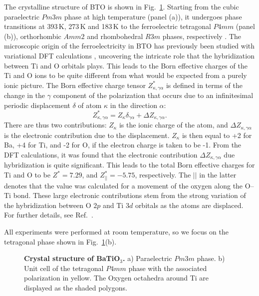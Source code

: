The crystalline structure of BTO is shown in Fig.~\ref{fig:BTO_crystal}.
Starting from the cubic paraelectric $Pm3m$ phase at high temperature (panel (a)), it undergoes phase transitions at 393\,K, 273\,K and 183\,K to the ferroelectric tetragonal $P4mm$ (panel (b)), orthorhombic $Amm2$ and rhombohedral $R3m$ phases, respectively \cite{Mason1948, VonHippel1950, Marton2010}.
The microscopic origin of the ferroelectricity in BTO has previously been studied with variational DFT calculations \cite{Ghosez1995}, uncovering the intricate role that the hybridization between Ti and O orbitals plays.
This leads to the Born effective charges of the Ti and O ions to be quite different from what would be expected from a purely ionic picture.
The Born effective charge tensor $Z^*_{\kappa, \gamma\alpha}$ is defined in terms of the change in the $\gamma$ component of the polarization that occurs due to an infinitesimal periodic displacement $\delta$ of atom $\kappa$ in the direction $\alpha$:
\begin{equation}
Z^*_{\kappa, \gamma\alpha} = Z_{\kappa} \delta_{\gamma\alpha} + \Delta Z_{\kappa, \gamma\alpha}.
\end{equation}
There are thus two contributions: $Z_{\kappa}$ is the ionic charge of the atom, and $\Delta Z_{\kappa, \gamma\alpha}$ is the electronic contribution due to the displacement.
$Z_{\kappa}$ is then equal to +2 for Ba, +4 for Ti, and -2 for O, if the electron charge is taken to be -1.
From the DFT calculations, it was found that the electronic contribution $\Delta Z_{\kappa, \gamma\alpha}$ due hybridization is quite significant.
This leads to the total Born effective charges for Ti and O to be $Z^* = 7.29$, and $Z^*_{||} = -5.75$, respectively.
The $||$ in the latter denotes that the value was calculated for a movement of the oxygen along the O--Ti bond.
These large electronic contributions stem from the strong variation of the hybridization between O $2p$ and Ti $3d$ orbitals as the atoms are displaced.
For further details, see Ref.~\cite{Ghosez1995}.

All experiments were performed at room temperature, so we focus on the tetragonal phase shown in Fig.~\ref{fig:BTO_crystal}(b).
\begin{figure}[h]
	\caption{\label{fig:BTO_crystal}{\bf Crystal structure of BaTiO$_3$.} a) Paraelectric $Pm3m$ phase. b) Unit cell of the tetragonal $P4mm$ phase with the associated polarization in yellow. The Oxygen octahedra around Ti are displayed as the shaded polygons.}
\end{figure}

